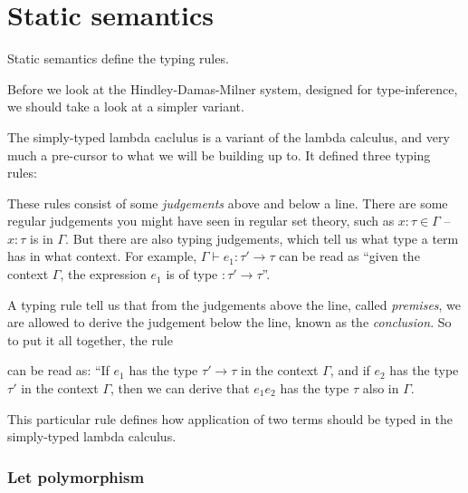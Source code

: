 \section{Static semantics}

Static semantics define the typing rules.

Before we look at the Hindley-Damas-Milner system, designed for
type-inference, we should take a look at a simpler variant.

The simply-typed lambda caclulus is a variant of the lambda
calculus, and very much a pre-cursor to what we will be building up
to. It defined three typing rules:
These rules consist of some \textit{judgements} above and below a line. There
are some regular judgements you might have seen in regular set theory,
such as $x : \tau \in \Gamma$ -- $x : \tau$ is in $\Gamma$. But there are also typing
judgements, which tell us what type a term has in what context. For
example, $\Gamma \vdash e_1 : \tau' \rightarrow \tau$ can be read as ``given the context
$\Gamma$, the expression $e_1$ is of type $:\tau' \rightarrow \tau$''.

A typing rule tell us that from the judgements above the line,
called \textit{premises}, we are allowed to derive the judgement
below the line, known as the \textit{conclusion}. So to put it all
together, the rule
\begin{mathpar}
\end{mathpar}
can be read as: ``If $e_1$ has the type $\tau' \rightarrow \tau$ in the context $\Gamma$,
and if $e_2$ has the type $\tau'$ in the context $\Gamma$, then we can derive
that $e_1 e_2$ has the type $\tau$ also in $\Gamma$.

This particular rule defines how application of two terms should be
typed in the simply-typed lambda calculus. 

\subsubsection{Let polymorphism}

